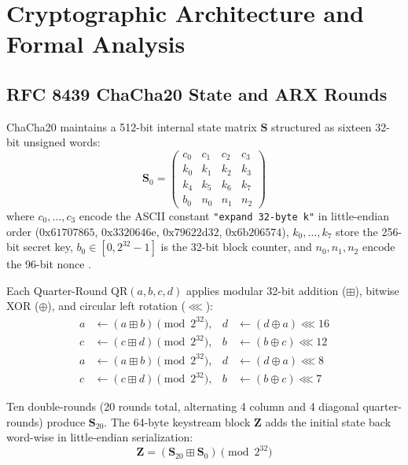 \documentclass[conference]{IEEEtran}
\begin{document}
\section{Cryptographic Architecture and Formal Analysis}
\label{sec:arch}

\subsection{RFC 8439 ChaCha20 State and ARX Rounds}
ChaCha20 maintains a 512-bit internal state matrix $\mathbf{S}$ structured as sixteen 32-bit unsigned words:
\begin{equation}
\mathbf{S}_0 = \begin{pmatrix} 
c_0 & c_1 & c_2 & c_3 \\ 
k_0 & k_1 & k_2 & k_3 \\ 
k_4 & k_5 & k_6 & k_7 \\ 
b_0 & n_0 & n_1 & n_2 
\end{pmatrix}
\end{equation}
where $c_0, \dots, c_3$ encode the ASCII constant \texttt{"expand 32-byte k"} in little-endian order ($0\text{x}61707865$, $0\text{x}3320646\text{e}$, $0\text{x}79622\text{d}32$, $0\text{x}6\text{b}206574$), $k_0, \dots, k_7$ store the 256-bit secret key, $b_0 \in [0, 2^{32}-1]$ is the 32-bit block counter, and $n_0, n_1, n_2$ encode the 96-bit nonce \cite{rfc8439, rashidi2025highperformance}.

Each Quarter-Round $\text{QR}(a, b, c, d)$ applies modular 32-bit addition ($\boxplus$), bitwise XOR ($\oplus$), and circular left rotation ($\lll$):
\begin{align}
a &\leftarrow (a \boxplus b) \pmod{2^{32}}, & d &\leftarrow (d \oplus a) \lll 16 \\
c &\leftarrow (c \boxplus d) \pmod{2^{32}}, & b &\leftarrow (b \oplus c) \lll 12 \\
a &\leftarrow (a \boxplus b) \pmod{2^{32}}, & d &\leftarrow (d \oplus a) \lll 8 \\
c &\leftarrow (c \boxplus d) \pmod{2^{32}}, & b &\leftarrow (b \oplus c) \lll 7
\end{align}

Ten double-rounds (20 rounds total, alternating 4 column and 4 diagonal quarter-rounds) produce $\mathbf{S}_{20}$. The 64-byte keystream block $\mathbf{Z}$ adds the initial state back word-wise in little-endian serialization:
\begin{equation}
\mathbf{Z} = (\mathbf{S}_{20} \boxplus \mathbf{S}_0) \pmod{2^{32}}
\end{equation}
\end{document}
